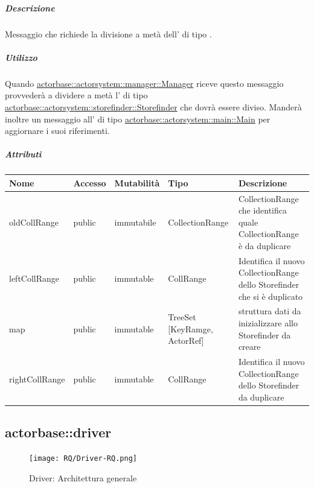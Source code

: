 \documentclass{scalatekids-article}
\begin{document}
\subparagraph{Descrizione}

Messaggio che richiede la divisione a metà dell' di tipo
.

\subparagraph{Utilizzo}

Quando \hyperref[sec:actorbase::actorsystem::manager::Manager]{actorbase::\allowbreak{}actorsystem::\allowbreak{}manager::\allowbreak{}Manager}
riceve questo messaggio provvederà a dividere a metà l' di tipo
\hyperref[sec:actorbase::actorsystem::storefinder::Storefinder]{actorbase::\allowbreak{}actorsystem::\allowbreak{}storefinder::\allowbreak{}Storefinder}
che dovrà essere diviso. Manderà inoltre un messaggio all' di tipo
\hyperref[sec:actorbase::actorsystem::main::Main]{actorbase::\allowbreak{}actorsystem::\allowbreak{}main::\allowbreak{}Main}
per aggiornare i suoi riferimenti.

\subparagraph{Attributi}
\begin{tabular}{| p{3cm} | p{1.5cm} | p{2cm} | p{2cm} | p{8.5cm} |}
  \hline
  Nome & Accesso & Mutabilità & Tipo & Descrizione \\
  \hline
  oldCollRange & public & immutabile & CollectionRange & CollectionRange che identifica quale CollectionRange è da duplicare \\
  \hline
  leftCollRange & public & immutable & CollRange & Identifica il nuovo CollectionRange dello Storefinder che si è duplicato \\
  \hline
  map & public & immutable & TreeSet [KeyRamge, ActorRef] & struttura dati da inizializzare allo Storefinder da creare\\
  \hline
  rightCollRange & public & immutable & CollRange & Identifica il nuovo CollectionRange dello Storefinder da duplicare \\
  \hline
\end{tabular}


\subsection{actorbase::driver}
\label{sec:actorbase::driver}

\begin{figure}[H]
  \begin{center}
    \texttt{[image: RQ/Driver-RQ.png]}
    \caption{Driver: Architettura generale}
  \end{center}
\end{figure}
\end{document}
